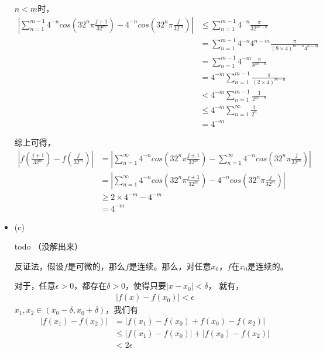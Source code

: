 \documentclass{article}
\begin{document}
\begin{itemize}
        $n < m$时，
        \begin{align*}
          \left|\sum\limits_{n = 1}^{m-1} 4^{-n} cos(32^n \pi \frac{j + 1}{32^m}) - 4^{-n} cos(32^n \pi \frac{j}{32^m}) \right|
           & \leq \sum\limits_{n = 1}^{m-1} 4^{-n}\frac{\pi}{32^{m - n}}                         \\
           & = \sum\limits_{n = 1}^{m-1} 4^{-n}4^{n-m}\frac{\pi}{(8 \times 4)^{m - n} 4^{n - m}} \\
           & = \sum\limits_{n = 1}^{m-1} 4^{-m}\frac{\pi}{8^{m - n}}                             \\
           & = 4^{-m}\sum\limits_{n = 1}^{m-1} \frac{\pi}{(2 \times 4)^{m - n}}                  \\
           & < 4^{-m} \sum\limits_{n = 1}^{m-1} \frac{1}{2^{m - n}}                              \\
           & \leq 4^{-m} \sum\limits_{n = 1}^{\infty} \frac{1}{2^{n}}                            \\
           & = 4^{-m}
        \end{align*}

        综上可得，
        \begin{align*}
          \left|f(\frac{j + 1}{32^m}) - f(\frac{j}{32^m})\right|
           & = \left|\sum\limits_{n = 1}^{\infty} 4^{-n} cos(32^n \pi \frac{j + 1}{32^m}) - \sum\limits_{n = 1}^{\infty} 4^{-n} cos(32^n \pi \frac{j}{32^m}) \right| \\
           & =  \left|\sum\limits_{n = 1}^{\infty} 4^{-n} cos(32^n \pi \frac{j + 1}{32^m}) - 4^{-n} cos(32^n \pi \frac{j}{32^m}) \right|                             \\
           & \geq 2 \times 4^{-m} - 4^{-m}                                                                                                                           \\
           & = 4^{-m}
        \end{align*}
  \item (c)

        todo （没解出来）

        反证法，假设$f$是可微的，那么$f$是连续。那么，对任意$x_0$，$f$在$x_0$是连续的。

        对于，任意$\epsilon > 0$，都存在$\delta > 0$，使得只要$|x - x_0| < \delta$，
        就有，
        \begin{align*}
          \left|f(x) - f(x_0)\right| < \epsilon
        \end{align*}
        $x_1, x_2 \in (x_0 - \delta, x_0 + \delta)$，我们有
        \begin{align*}
          \left|f(x_1) - f(x_2)\right|
           & = \left|f(x_1) - f(x_0) + f(x_0) - f(x_2)\right|                 \\
           & \leq \left|f(x_1) - f(x_0)\right| + \left|f(x_0) - f(x_2)\right| \\
           & < 2\epsilon
        \end{align*}


\end{itemize}
\end{document}
